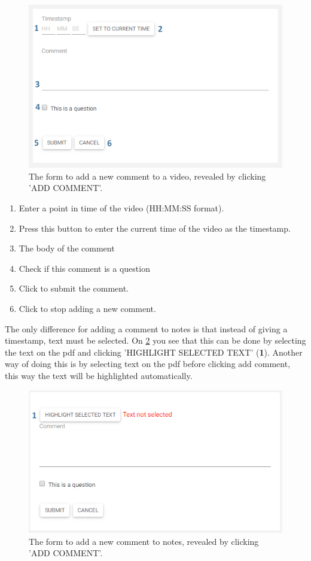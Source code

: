 \documentclass[a4paper,11pt]{report}
\begin{document}
\begin{figure}[H]
\centering
\includegraphics[scale=0.55]{imgs/stu_add_comment.png}
\caption{The form to add a new comment to a video, revealed by clicking 'ADD COMMENT'.}
\label{fig:stu_add_comment}
\end{figure}
\begin{enumerate}
\item Enter a point in time of the video (HH:MM:SS format).
\item Press this button to enter the current time of the video as the timestamp.
\item The body of the comment
\item Check if this comment is a question
\item Click to submit the comment.
\item Click to stop adding a new comment.
\end{enumerate}

The only difference for adding a comment to notes is that instead of giving a timestamp, text must be selected. On \ref{fig:stu_add_comment2} you see that this can be done by selecting the text on the pdf and clicking 'HIGHLIGHT SELECTED TEXT' (\textbf{1}). Another way of doing this is by selecting text on the pdf before clicking add comment, this way the text will be highlighted automatically.

\begin{figure}[H]
\centering
\includegraphics[scale=0.55]{imgs/stu_add_comment2.png}
\caption{The form to add a new comment to notes, revealed by clicking 'ADD COMMENT'.}
\label{fig:stu_add_comment2}
\end{figure}
\end{document}
